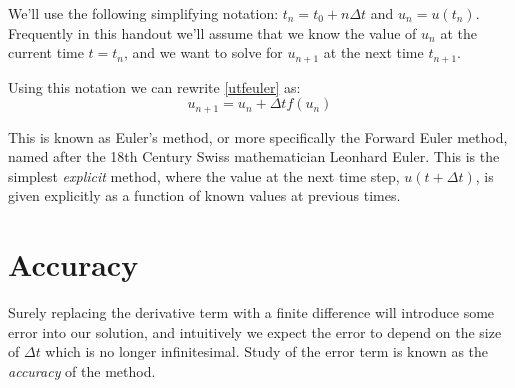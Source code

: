 \documentclass{article}
\newcommand{\dt}{\Delta t}
\newcommand{\uni}{u_{n+1}}
\begin{document}
We'll use the following simplifying notation:
$t_n = t_0 + n\dt$ 
and $u_n = u(t_n)$.
Frequently in this handout we'll assume that we know the value of $u_n$ at the current time $t=t_n$,
 and we want to solve for $\uni$ at the next time $t_{n+1}$.


Using this notation we can rewrite \eqref{utfeuler} as:
\begin{equation}
    \boxed{\uni = u_n + \dt f(u_n)}
    \label{feuler}
    \tag{Forward Euler}
\end{equation}

This is known as Euler's method, or more specifically the Forward Euler method, 
named after the 18th Century Swiss mathematician Leonhard Euler.
This is the simplest \emph{explicit} method, where the value at the next time step, $u(t+\dt)$, 
is given explicitly as a function of known values at previous times.

\section{Accuracy}

Surely replacing the derivative term with a finite difference will introduce some error into our solution,
and intuitively we expect the error to depend on the size of $\dt$ which is no longer infinitesimal.
Study of the error term is known as the \emph{accuracy} of the method.
\end{document}
